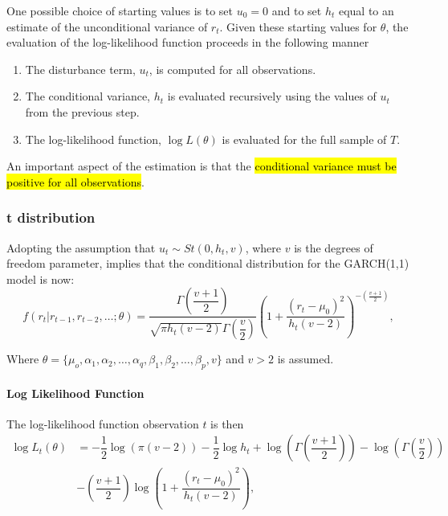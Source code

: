 \documentclass[11pt]{article}
\begin{document}
One possible choice of starting values is to set $u_0=0$ and to set $h_t$ equal to an estimate of the unconditional variance of $r_t$. Given these starting values for $\theta$, the evaluation of the log-likelihood function proceeds in the following manner

\begin{procedure}

\begin{enumerate}

\item The disturbance term, $u_t$, is computed for all observations.
\item The conditional variance, $h_t$ is evaluated recursively using the values of $u_t$ from the previous step.
\item The log-likelihood function, $\log L(\theta)$ is evaluated for the full sample of $T$. 

\end{enumerate}
\end{procedure}
\begin{note}
An important aspect of the estimation is that the \hl{conditional variance must be positive for all observations}.
\end{note}

\subsubsection{t distribution}

Adopting the assumption that $u_t \sim St(0, h_t, v)$, where $v$ is the degrees of freedom parameter, implies that the conditional distribution for the GARCH(1,1) model is now:
\begin{equation*}
    f(r_t|r_{t-1},r_{t-2}, \ldots; \theta) = \dfrac{\Gamma\left(\dfrac{v+1}{2}\right)}{\sqrt{\pi h_t (v-2)}\Gamma\left(\dfrac{v}{2}\right)} \left(1 + \dfrac{(r_t - \mu_0)^2}{h_t (v-2)}\right)^{-(\frac{v+1}{2})},
\end{equation*}

Where $\theta = \{\mu_o, \alpha_1, \alpha_2, \ldots, \alpha_q, \beta_1, \beta_2, \ldots, \beta_p, v\}$ and $v>2$ is assumed.

\paragraph{Log Likelihood Function} \mbox{}

The log-likelihood function observation $t$ is then
\begin{equation}
\begin{aligned}
\log L_t (\theta) &= -\dfrac{1}{2} \log(\pi (v-2)) - \dfrac{1}{2} \log h_t + \log \left( \Gamma \left( \dfrac{v+1}{2}\right) \right) - \log \left(\Gamma \left(\dfrac{v}{2}\right)\right) \\
&- \left( \dfrac{v+1}{2}\right)\log \left(1+ \dfrac{(r_t-\mu_0)^2}{h_t (v-2)}\right),
\end{aligned}
\end{equation}
\end{document}
